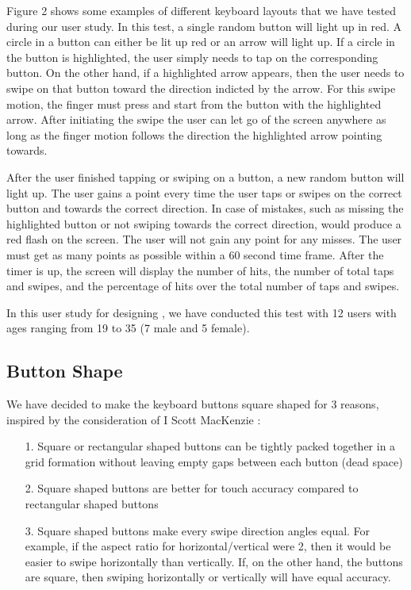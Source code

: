 Figure 2 shows some examples of different keyboard layouts that we have tested during our user study. In this test, a single random button will light up in red. A circle in a button can either be lit up red or an arrow will light up. If a circle in the button is highlighted, the user simply needs to tap on the corresponding button. On the other hand, if a highlighted arrow appears, then the user needs to swipe on that button toward the direction indicted by the arrow. For this swipe motion, the finger must press and start from the button with the highlighted arrow. After initiating the swipe the user can let go of the screen anywhere as long as the finger motion follows the direction the highlighted arrow pointing towards.

After the user finished tapping or swiping on a button, a new random button will light up. The user gains a point every time the user taps or swipes on the correct button and towards the correct direction. In case of mistakes, such as missing the highlighted button or not swiping towards the correct direction, would produce a red flash on the screen. The user will not gain any point for any misses. The user must get as many points as possible within a 60 second time frame. After the timer is up, the screen will display the number of hits, the number of total taps and swipes, and the percentage of hits over the total number of taps and swipes.

In this user study for designing \papertitle, we have conducted this test with 12 users with ages ranging from 19 to 35 (7 male and 5 female).

\subsection{Button Shape}
We have decided to make the keyboard buttons square shaped for 3 reasons, inspired by the consideration of I Scott MacKenzie \cite{opti}:
\begin{itemize}
\item[1.]Square or rectangular shaped buttons can be tightly packed together in a grid formation without leaving empty gaps between each button (dead space)
\item[2.]Square shaped buttons are better for touch accuracy compared to rectangular shaped buttons
\item[3.]Square shaped buttons make every swipe direction angles equal. For example, if the aspect ratio for horizontal/vertical were 2, then it would be easier to swipe horizontally than vertically. If, on the other hand, the buttons are square, then swiping horizontally or vertically will have equal accuracy.
\end{itemize}

